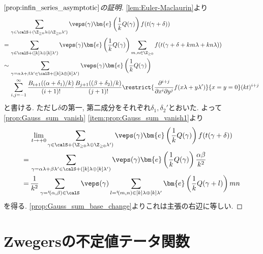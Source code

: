 \documentclass[11pt,b5paper,oneside,lualatex]{ltjsarticle} %
\numberwithin{equation}{section} %
\begin{document}
\begin{proof}[$ \cref{prop:infin_series_asymptotic} $の証明]
	\cref{lem:Euler-Maclaurin}より
	\begin{align}
		&\sum_{\gamma \in \calS + (\Z_{\ge 0} \lambda \oplus \Z_{\ge 0} \lambda')} 
		\veps(\gamma)
		\bm{e} \left( \frac{1}{k} Q(\gamma) \right)
		f(t(\gamma + \delta))
		\\
		= \,
		&\sum_{\gamma \in \calS + ([k] \lambda \oplus [k] \lambda')} 
		\veps(\gamma)
		\bm{e} \left( \frac{1}{k} Q(\gamma) \right)
		\sum_{m, n \in \Z_{\ge 0}}
		f(t(\gamma + \delta + km \lambda + kn \lambda))
		\\
		\sim \,
		&\sum_{\gamma = \alpha \lambda + \beta \lambda' \in \calS + ([k] \lambda \oplus [k] \lambda')} 
		\veps(\gamma)
		\bm{e} \left( \frac{1}{k} Q(\gamma) \right)
		\\
		&\sum_{i, j = -1}^{\infty} \frac{B_{i+1}((\alpha + \delta_1)/k)}{(i+1)!} \frac{B_{j+1}((\beta + \delta_2)/k)}{(j+1)!}
		\restrict{\frac{\partial^{i+j} }{\partial x^i \partial y^j} f(x \lambda + y \lambda')}{x=y=0} (kt)^{i+j}
	\end{align}
	と書ける.
	ただし$ \delta $の第一, 第二成分をそれぞれ$ \delta_1, \delta_2'$とおいた. 
	よって\cref{prop:Gauss_sum_vanish} \cref{item:prop:Gauss_sum_vanish1}より
	\begin{align}
		&\lim_{t \to +0} 
		\sum_{\gamma \in \calS + (\Z_{\ge 0} \lambda \oplus \Z_{\ge 0} \lambda')} 
		\veps(\gamma)
		\bm{e} \left( \frac{1}{k} Q(\gamma) \right)
		f(t(\gamma + \delta))
		\\
		= \,
		&\sum_{\gamma = \alpha \lambda + \beta \lambda' \in \calS + ([k] \lambda \oplus [k] \lambda')} 
		\veps(\gamma)
		\bm{e} \left( \frac{1}{k} Q(\gamma) \right)
		\frac{\alpha \beta}{k^2}
		\\
		= \,
		&\frac{1}{k^2}
		\sum_{\gamma = {}^t\!(\alpha, \beta) \in \calS} 
		\veps(\gamma)
		\sum_{l = {}^t\!(m, n) \in [k] \lambda \oplus [k] \lambda'}
		\bm{e}\left( \frac{1}{k} Q(\gamma + l) \right) mn
	\end{align}
	を得る. 
	\cref{prop:Gauss_sum_base_change}よりこれは主張の右辺に等しい. 
\end{proof}


\section{Zwegersの不定値テータ関数} \label{sec:Zwegers_theta}
\end{document}

